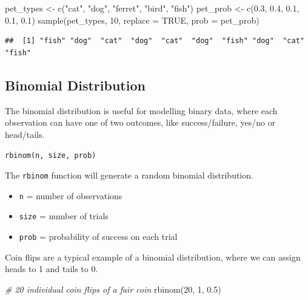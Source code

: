 \documentclass[
  oneside]{book}
\newenvironment{Shaded}{\begin{snugshade}}{\end{snugshade}}
\newcommand{\AttributeTok}[1]{\textcolor[rgb]{0.77,0.63,0.00}{#1}}
\newcommand{\CommentTok}[1]{\textcolor[rgb]{0.56,0.35,0.01}{\textit{#1}}}
\newcommand{\ConstantTok}[1]{\textcolor[rgb]{0.00,0.00,0.00}{#1}}
\newcommand{\DecValTok}[1]{\textcolor[rgb]{0.00,0.00,0.81}{#1}}
\newcommand{\FloatTok}[1]{\textcolor[rgb]{0.00,0.00,0.81}{#1}}
\newcommand{\FunctionTok}[1]{\textcolor[rgb]{0.00,0.00,0.00}{#1}}
\newcommand{\NormalTok}[1]{#1}
\newcommand{\OtherTok}[1]{\textcolor[rgb]{0.56,0.35,0.01}{#1}}
\newcommand{\StringTok}[1]{\textcolor[rgb]{0.31,0.60,0.02}{#1}}
\providecommand{\tightlist}{%
  \setlength{\itemsep}{0pt}\setlength{\parskip}{0pt}}
\begin{document}
\begin{Shaded}
\begin{Highlighting}[]
\NormalTok{pet\_types }\OtherTok{\textless{}{-}} \FunctionTok{c}\NormalTok{(}\StringTok{"cat"}\NormalTok{, }\StringTok{"dog"}\NormalTok{, }\StringTok{"ferret"}\NormalTok{, }\StringTok{"bird"}\NormalTok{, }\StringTok{"fish"}\NormalTok{)}
\NormalTok{pet\_prob }\OtherTok{\textless{}{-}} \FunctionTok{c}\NormalTok{(}\FloatTok{0.3}\NormalTok{, }\FloatTok{0.4}\NormalTok{, }\FloatTok{0.1}\NormalTok{, }\FloatTok{0.1}\NormalTok{, }\FloatTok{0.1}\NormalTok{)}
\FunctionTok{sample}\NormalTok{(pet\_types, }\DecValTok{10}\NormalTok{, }\AttributeTok{replace =} \ConstantTok{TRUE}\NormalTok{, }\AttributeTok{prob =}\NormalTok{ pet\_prob)}
\end{Highlighting}
\end{Shaded}

\begin{verbatim}
##  [1] "fish" "dog"  "cat"  "dog"  "cat"  "dog"  "fish" "dog"  "cat"  "fish"
\end{verbatim}

\hypertarget{binomial}{%
\subsection{Binomial Distribution}\label{binomial}}

The binomial distribution is useful for modelling binary data, where each observation can have one of two outcomes, like success/failure, yes/no or head/tails.

\texttt{rbinom(n,\ size,\ prob)}

The \texttt{rbinom} function will generate a random binomial distribution.

\begin{itemize}
\tightlist
\item
  \texttt{n} = number of observations
\item
  \texttt{size} = number of trials
\item
  \texttt{prob} = probability of success on each trial
\end{itemize}

Coin flips are a typical example of a binomial distribution, where we can assign heads to 1 and tails to 0.

\begin{Shaded}
\begin{Highlighting}[]
\CommentTok{\# 20 individual coin flips of a fair coin}
\FunctionTok{rbinom}\NormalTok{(}\DecValTok{20}\NormalTok{, }\DecValTok{1}\NormalTok{, }\FloatTok{0.5}\NormalTok{)}
\end{Highlighting}
\end{Shaded}
\end{document}
